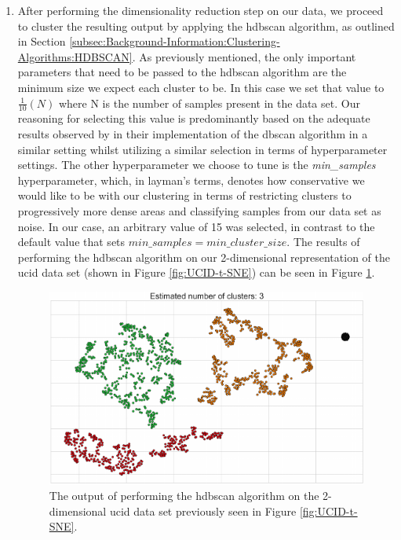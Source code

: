 \begin{adjustwidth}{-1.65cm}{-0.0cm}
\begin{enumerate}[label=Step 2.\arabic*:, leftmargin=*]
        \item After performing the dimensionality reduction step on our data, we proceed to cluster the resulting output by applying the \gls{hdbscan} algorithm, as outlined in Section \ref{subsec:Background-Information:Clustering-Algorithms:HDBSCAN}. As previously mentioned, the only important parameters that need to be passed to the \gls{hdbscan} algorithm are the minimum size we expect each cluster to be. In this case we set that value to $\frac{1}{10}\left(N\right)$ where N is the number of samples present in the data set. Our reasoning for selecting this value is predominantly based on the adequate results observed by \citet{Kong} in their implementation of the \gls{dbscan} algorithm in a similar setting whilst utilizing a similar selection in terms of hyperparameter settings. The other hyperparameter we choose to tune is the \textit{min\_samples} hyperparameter, which, in layman's terms, denotes how conservative we would like to be with our clustering in terms of restricting clusters to progressively more dense areas and classifying samples from our data set as noise. In our case, an arbitrary value of 15 was selected, in contrast to the default value that sets $min\_samples = min\_cluster\_size$. The results of performing the \gls{hdbscan} algorithm on our 2-dimensional representation of the \gls{ucid} data set (shown in Figure \ref{fig:UCID-t-SNE}) can be seen in Figure \ref{fig:UCID-HDBSCAN-1}.
        
        \begin{figure}[H]
            \centering
            \includegraphics[width=\textwidth]{Images/Chapter 5/Stage 2/UCID/UCID-HDBSCAN-1.pdf}
            \caption{The output of performing the \gls{hdbscan} algorithm on the 2-dimensional \gls{ucid} data set previously seen in Figure \ref{fig:UCID-t-SNE}.}
            \label{fig:UCID-HDBSCAN-1}
        \end{figure}
        

\end{enumerate}
\end{adjustwidth}
